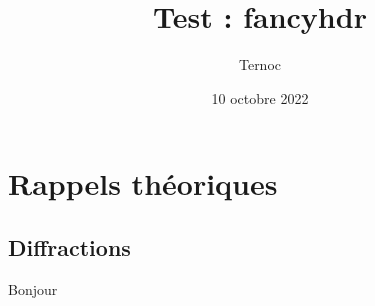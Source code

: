 \documentclass[twoside, a4paper, titlepage]{article}
\title{Test \no 2 : fancyhdr}
\author{Ternoc}
\date{10 octobre 2022}
\begin{document}
\maketitle
\tableofcontents
\newpage
   \section{Rappels théoriques}
      \subsection{Diffractions}
         Bonjour
\end{document}

